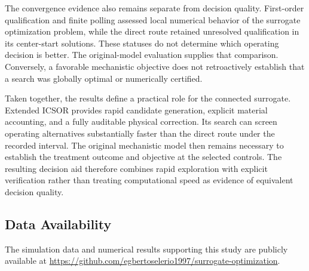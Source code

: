 The convergence evidence also remains separate from decision quality. First-order qualification and finite polling assessed local numerical behavior of the surrogate optimization problem, while the direct route retained unresolved qualification in its center-start solutions. These statuses do not determine which operating decision is better. The original-model evaluation supplies that comparison. Conversely, a favorable mechanistic objective does not retroactively establish that a search was globally optimal or numerically certified.

Taken together, the results define a practical role for the connected surrogate. Extended ICSOR provides rapid candidate generation, explicit material accounting, and a fully auditable physical correction. Its search can screen operating alternatives substantially faster than the direct route under the recorded interval. The original mechanistic model then remains necessary to establish the treatment outcome and objective at the selected controls. The resulting decision aid therefore combines rapid exploration with explicit verification rather than treating computational speed as evidence of equivalent decision quality.

\subsection{Data Availability}
\label{sec:plant_data_availability}

The simulation data and numerical results supporting this study are publicly available at \url{https://github.com/egbertoselerio1997/surrogate-optimization}.